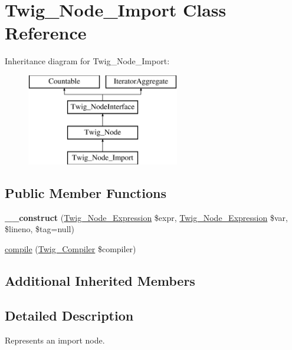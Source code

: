 \hypertarget{classTwig__Node__Import}{}\section{Twig\+\_\+\+Node\+\_\+\+Import Class Reference}
\label{classTwig__Node__Import}
Inheritance diagram for Twig\+\_\+\+Node\+\_\+\+Import\+:\begin{figure}[H]
\begin{center}
\leavevmode
\includegraphics[height=4.000000cm]{classTwig__Node__Import}
\end{center}
\end{figure}
\subsection*{Public Member Functions}
\begin{DoxyCompactItemize}
\item 
{\bfseries \+\_\+\+\_\+construct} (\hyperlink{classTwig__Node__Expression}{Twig\+\_\+\+Node\+\_\+\+Expression} \$expr, \hyperlink{classTwig__Node__Expression}{Twig\+\_\+\+Node\+\_\+\+Expression} \$var, \$lineno, \$tag=null)\hypertarget{classTwig__Node__Import_aa131799b2ef0b15c946248d2b8498ee8}{}\label{classTwig__Node__Import_aa131799b2ef0b15c946248d2b8498ee8}

\item 
\hyperlink{classTwig__Node__Import_a34ba3386e9ea9cac2b24ad1bf83c0815}{compile} (\hyperlink{classTwig__Compiler}{Twig\+\_\+\+Compiler} \$compiler)
\end{DoxyCompactItemize}
\subsection*{Additional Inherited Members}


\subsection{Detailed Description}
Represents an import node.

